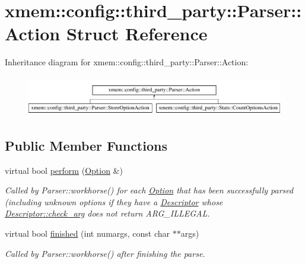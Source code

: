 \hypertarget{structxmem_1_1config_1_1third__party_1_1_parser_1_1_action}{}\section{xmem\+:\+:config\+:\+:third\+\_\+party\+:\+:Parser\+:\+:Action Struct Reference}
\label{structxmem_1_1config_1_1third__party_1_1_parser_1_1_action}
Inheritance diagram for xmem\+:\+:config\+:\+:third\+\_\+party\+:\+:Parser\+:\+:Action\+:\begin{figure}[H]
\begin{center}
\leavevmode
\includegraphics[height=1.794872cm]{structxmem_1_1config_1_1third__party_1_1_parser_1_1_action}
\end{center}
\end{figure}
\subsection*{Public Member Functions}
\begin{DoxyCompactItemize}
\item 
virtual bool \hyperlink{structxmem_1_1config_1_1third__party_1_1_parser_1_1_action_aeffc43365955b3dc5f54552093518aa5}{perform} (\hyperlink{classxmem_1_1config_1_1third__party_1_1_option}{Option} \&)
\begin{DoxyCompactList}\small\item\em Called by Parser\+::workhorse() for each \hyperlink{classxmem_1_1config_1_1third__party_1_1_option}{Option} that has been successfully parsed (including unknown options if they have a \hyperlink{structxmem_1_1config_1_1third__party_1_1_descriptor}{Descriptor} whose \hyperlink{structxmem_1_1config_1_1third__party_1_1_descriptor_a65b39f8d61de820bb5001d590e7dea5d}{Descriptor\+::check\+\_\+arg} does not return A\+R\+G\+\_\+\+I\+L\+L\+E\+G\+A\+L. \end{DoxyCompactList}\item 
virtual bool \hyperlink{structxmem_1_1config_1_1third__party_1_1_parser_1_1_action_a8f392f5dd42f483fa45ae5d83c9389ac}{finished} (int numargs, const char $\ast$$\ast$args)
\begin{DoxyCompactList}\small\item\em Called by Parser\+::workhorse() after finishing the parse. \end{DoxyCompactList}\end{DoxyCompactItemize}


